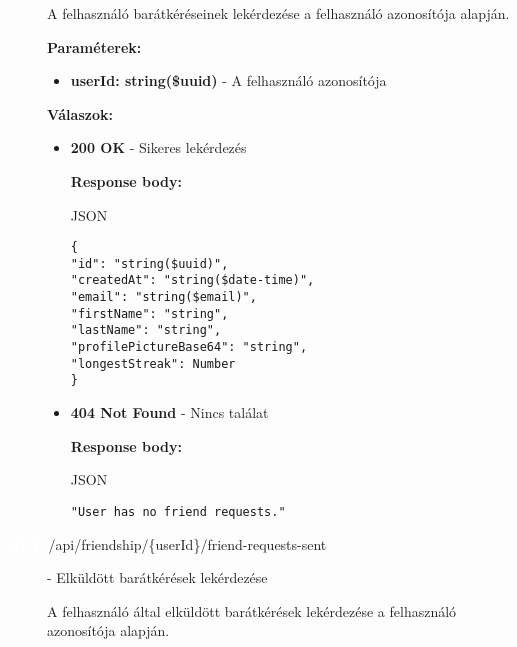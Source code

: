 \documentclass[12pt]{report}
\newcommand{\httpGet}[1]{\colorbox{getColor}{\textbf{\textcolor{white}{GET}}}~#1}
\begin{document}
\begin{description}
    \vspace{0.5cm}
    \begin{sloppypar}
      A felhasználó barátkéréseinek lekérdezése a felhasználó azonosítója alapján.
    \end{sloppypar}

    \vspace{0.5cm}
    \textbf{Paraméterek:}
    \begin{itemize}
      \item \textbf{userId: string(\$uuid)} - A felhasználó azonosítója
    \end{itemize}

    \vspace{0.5cm}
    \textbf{Válaszok:}
    \begin{itemize}
      \item \textbf{200 OK} - Sikeres lekérdezés

        \textbf{Response body:}
        \begin{codeblock}{JSON}
          \begin{verbatim}
{
"id": "string($uuid)",
"createdAt": "string($date-time)",
"email": "string($email)",
"firstName": "string",
"lastName": "string",
"profilePictureBase64": "string",
"longestStreak": Number
}
          \end{verbatim}
        \end{codeblock}

      \item \textbf{404 Not Found} - Nincs találat

        \textbf{Response body:}
        \begin{codeblock}{JSON}
          \begin{verbatim}
"User has no friend requests."
          \end{verbatim}
        \end{codeblock}
    \end{itemize}

  \item[\httpGet{/api/friendship/\{userId\}/friend-requests-sent}] - Elküldött barátkérések lekérdezése
  
    \vspace{0.5cm}
    \begin{sloppypar}
      A felhasználó által elküldött barátkérések lekérdezése a felhasználó azonosítója alapján.
    \end{sloppypar}


\end{description}
\end{document}
